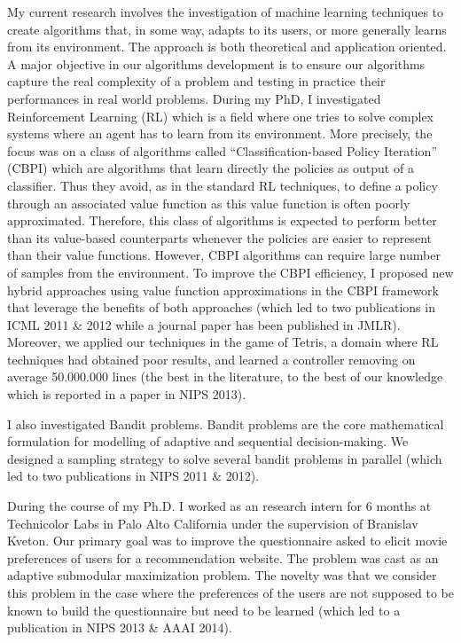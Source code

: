 My current research involves the investigation of machine learning techniques to create algorithms that, in some way, adapts to its users, or more generally learns from its environment. The approach is both theoretical and application oriented. A major objective in our algorithms development is to ensure our algorithms capture the real complexity of a problem and testing in practice their performances in real world problems. During my PhD, I investigated Reinforcement Learning (RL) which is a field where one tries to solve complex systems where an agent has to learn from its environment. More precisely, the focus was on a class of algorithms called ``Classification-based Policy Iteration'' (CBPI) which are algorithms that learn directly the policies as output of a classifier. Thus they avoid, as in the standard RL techniques, to define a policy through an associated value function as this value function is often poorly approximated. Therefore, this class of algorithms is expected to perform better than its value-based counterparts whenever the policies are easier to represent than their value functions. However, CBPI algorithms can require large number of samples from the environment. To improve the CBPI efficiency, I proposed new hybrid approaches using value function approximations in the CBPI framework that leverage the benefits of both approaches (which led to two publications in ICML 2011 \& 2012 while a journal paper has been published in JMLR). Moreover, we applied our techniques in the game of Tetris, a domain where RL techniques had obtained poor results, and learned a controller removing on average 50.000.000 lines (the best in the literature, to the best of our knowledge which is reported in a paper in NIPS 2013).

I also investigated Bandit problems. Bandit problems are the core mathematical formulation for modelling of adaptive and sequential decision-making. We designed a sampling strategy to solve several bandit problems in parallel (which led to two publications in NIPS 2011 \& 2012).

During the course of my Ph.D. I worked as an research intern for 6 months at Technicolor Labs in Palo Alto California under the supervision of Branislav Kveton.  Our primary goal was to improve the questionnaire asked to elicit movie preferences of users for a recommendation website. The problem was cast as an adaptive submodular maximization problem. The novelty was that we consider this problem in the case where the preferences of the users are not supposed to be known to build the questionnaire but need to be learned (which led to a publication in NIPS 2013 \& AAAI 2014).

